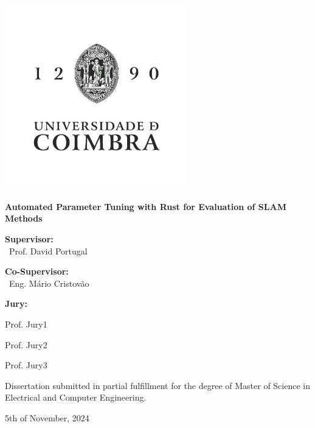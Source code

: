 \begin{titlepage}
    \begin{center}
    \includegraphics[width=0.6\textwidth]{images/UC_logos/UC_V_FundoClaro-negro.png}
    
    \vspace{0.8cm}
    {\Huge{\textbf{Automated Parameter Tuning with Rust for Evaluation of SLAM Methods}}\par}
    \vspace{1cm}
    {\large{\textbf{Supervisor:}\\\ Prof. David Portugal \par}}
    {\large{\textbf{Co-Supervisor:}\\\ Eng. Mário Cristovão \par}}

    \vspace{1cm}
    {\large{\textbf{Jury:}
    
    Prof. Jury1
    
    Prof. Jury2
    
    Prof. Jury3
    
    }}
    
    \vfill
    Dissertation submitted in partial fulfillment for the degree of Master of Science in Electrical and Computer Engineering.
    
    \vspace{0.5cm}
    {\large 5th of November, 2024\par}    
    
    
    \end{center}
\end{titlepage}